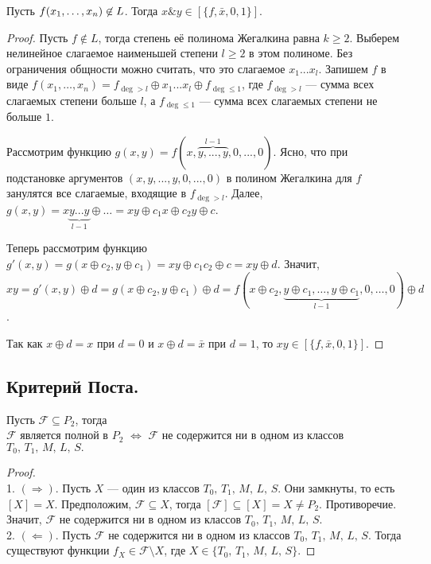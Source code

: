 \begin{lemma} Пусть $f(x_1, \ldots, x_n)\not\in L$. Тогда $x\& y \in [\{f, \bar{x}, 0, 1\}].$
\end{lemma}
\begin{proof} Пусть $f\not\in L$, тогда степень её полинома Жегалкина равна $k \geq 2$. Выберем нелинейное слагаемое наименьшей степени $l\geq 2$ в этом полиноме. Без ограничения общности можно считать, что это слагаемое $x_1...x_l$. Запишем $f$ в виде $f(x_1,\ldots,x_n) = f_{\deg > l} \oplus x_1...x_l \oplus f_{\deg \leq 1}$, где $f_{\deg > l}$ --- сумма всех слагаемых степени больше $l$, а $f_{\deg \leq 1}$ --- сумма всех слагаемых степени не больше $1$.

Рассмотрим функцию $g(x,y) = f(x, \overbrace{y,...,y}^{l-1}, 0,...,0)$. Ясно, что при подстановке аргументов $(x, y,...,y, 0,...,0)$ в полином Жегалкина для $f$ занулятся все слагаемые, входящие в $f_{\deg > l}$. 
Далее, $g(x,y) = x\underbrace{y...y}_{l-1} \oplus \ldots = xy \oplus c_1x \oplus c_2y \oplus c$. 

Теперь рассмотрим функцию $g'(x,y) = g(x\oplus c_2, y\oplus c_1) = xy \oplus c_1c_2 \oplus c = xy \oplus d$. Значит, $xy = g'(x,y) \oplus d = g(x\oplus c_2, y\oplus c_1) \oplus d = f(x \oplus c_2, \underbrace{y\oplus c_1,\ldots,y\oplus c_1}_{l-1},0,\ldots,0)\oplus d$. 

Так как %
$x\oplus d = x$ при $d=0$ и $x\oplus d = \bar{x}$ при $d=1$, то $xy \in [\{f, \bar{x}, 0, 1\}].$
\end{proof}

\subsection{Критерий Поста.}
\begin{theorem} Пусть $\mathcal{F} \subseteq P_2$, тогда \\ $\mathcal{F}$ является полной в $P_2$ $\Longleftrightarrow$ $\mathcal{F}$ не содержится ни в одном из классов $ T_0,\, T_1,\,M,\,L,\,S.$
\end{theorem}
\begin{proof}
~\\
1. $(\Rightarrow)$. Пусть $X$ --- один из классов $ T_0,\, T_1,\,M,\,L,\,S$. Они замкнуты, то есть $[X] = X$.
Предположим, $\mathcal{F} \subseteq X $, тогда $[\mathcal{F}] \subseteq [X] = X \neq P_2 $. Противоречие. Значит, $\mathcal{F}$ не содержится ни в одном из классов $ T_0,\, T_1,\,M,\,L,\,S.$
~\\
2. $(\Leftarrow)$. Пусть $\mathcal{F}$ не содержится ни в одном из классов $ T_0,\, T_1,\,M,\,L,\,S$. Тогда существуют функции $f_X \in \mathcal{F} \setminus X$, где $X \in \{T_0,\, T_1,\,M,\,L,\,S\}$. 
\end{proof}